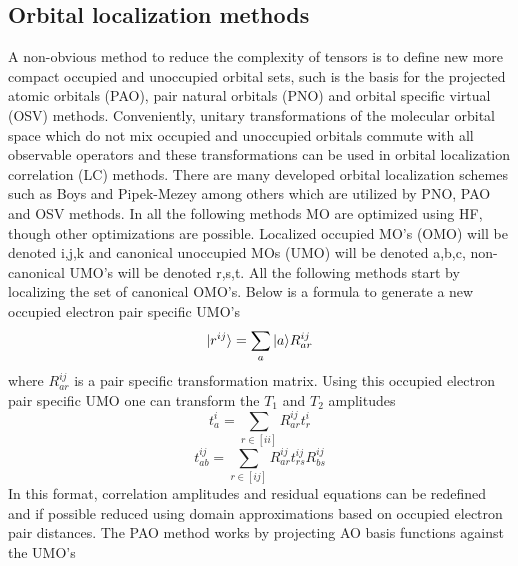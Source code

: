 	\subsection{Orbital localization methods}
		A non-obvious method to reduce the complexity of tensors is to define new more compact occupied and unoccupied orbital sets, such is the basis for the projected atomic orbitals (PAO), pair natural orbitals (PNO) and orbital specific virtual (OSV) methods. Conveniently, unitary transformations of the molecular orbital space which do not mix occupied and unoccupied orbitals commute with all observable operators\cite{SzaboAttila1982} and these transformations can be used in orbital localization correlation (LC) methods. There are many developed orbital localization schemes such as Boys and Pipek-Mezey\cite{Boughton1993} among others which are utilized by PNO, PAO and OSV methods. In all the following methods MO are optimized using HF, though other optimizations are possible. Localized occupied MO's (OMO) will be denoted i,j,k and canonical unoccupied MOs (UMO) will be denoted a,b,c, non-canonical UMO's will be denoted r,s,t. All the following methods start by localizing the set of canonical OMO's. Below is a formula to generate a new occupied electron pair specific UMO's 
			\begin{equation}
				| r^{ij} \rangle = \sum_a | a \rangle R^{ij}_{ar}
			\end{equation}
		where $R^{ij}_{ar}$ is a pair specific transformation matrix. Using this occupied electron pair specific UMO one can transform the $T_1$ and $T_2$ amplitudes%
			\begin{equation}
				t^i_a = \sum_{r\in[ii]} R^{ij}_{ar}t^i_r
			\end{equation}
			\begin{equation}
			t^{ij}_{ab} = \sum_{r\in[ij]} R^{ij}_{ar}t^{ij}_{rs}R^{ij}_{bs}
			\end{equation}
		In this format, correlation amplitudes and residual equations can be redefined and if possible reduced using domain approximations based on occupied electron pair distances\cite{Yang2012}.
		The PAO method works by projecting AO basis functions against the UMO's\cite{Pulay1983}
